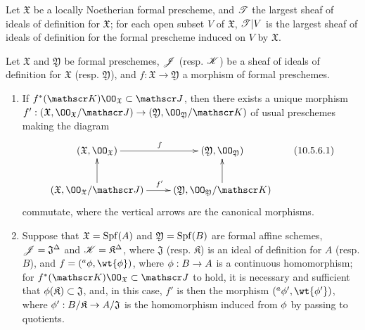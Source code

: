 \begin{cor}[10.5.5]
\label{1.10.5.5}
Let $\mathfrak{X}$ be a locally Noetherian formal prescheme, and $\mathscr{T}$ the largest sheaf of ideals of definition for $\mathfrak{X}$; for each open subset $V$ of $\mathfrak{X}$, $\mathscr{T}|V$ is the largest sheaf of ideals of definition for the formal prescheme induced on $V$ by $\mathfrak{X}$.
\end{cor}

\begin{prop}[10.5.6]
\label{1.10.5.6}
Let $\mathfrak{X}$ and $\mathfrak{Y}$ be formal preschemes, $\mathscr{J}$ (resp. $\mathscr{K}$) be a sheaf of ideals of definition for $\mathfrak{X}$ (resp. $\mathfrak{Y}$), and $f:\mathfrak{X}\to\mathfrak{Y}$ a morphism of formal preschemes.
\begin{enumerate}[label=\emph{(\roman*)}]
  \item If $f^*(\sh{K})\OO_\mathfrak{X}\subset\sh{J}$, then there exists a unique morphism $f':(\mathfrak{X},\OO_\mathfrak{X}/\sh{J})\to(\mathfrak{Y},\OO_\mathfrak{Y}/\sh{K})$ of usual preschemes making the diagram
    \begin{equation*}
    \label{1.10.5.6.1}
      \xymatrix{
        (\mathfrak{X},\OO_\mathfrak{X})\ar[r]^f &
        (\mathfrak{Y},\OO_\mathfrak{Y})\\
        (\mathfrak{X},\OO_\mathfrak{X}/\sh{J})\ar[r]^{f'}\ar[u] &
        (\mathfrak{Y},\OO_\mathfrak{Y}/\sh{K})\ar[u]
      }
      \tag{10.5.6.1}
    \end{equation*}
    commutate, where the vertical arrows are the canonical morphisms.
  \item Suppose that $\mathfrak{X}=\operatorname{Spf}(A)$ and $\mathfrak{Y}=\operatorname{Spf}(B)$ are formal affine schemes, $\mathscr{J}=\mathfrak{J}^\Delta$ and $\mathscr{K}=\mathfrak{K}^\Delta$, where $\mathfrak{J}$ (resp. $\mathfrak{K}$) is an ideal of definition for $A$ (resp. $B$), and $f=({}^a\vphi,\wt{\vphi})$, where $\vphi:B\to A$ is a continuous homomorphism;
    for $f^*(\sh{K})\OO_\mathfrak{X}\subset\sh{J}$ to hold, it is necessary and sufficient that $\phi(\mathfrak{K})\subset\mathfrak{J}$, and, in this case, $f'$ is then the morphism $({}^a\vphi',\wt{\vphi'})$, where $\vphi':B/\mathfrak{K}\to A/\mathfrak{J}$ is the homomorphism induced from $\phi$ by passing to quotients.
\end{enumerate}
\end{prop}

